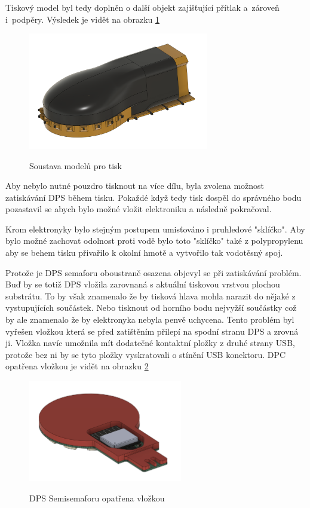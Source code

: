 Tiskový model byl tedy doplněn o další objekt zajišťující přítlak a~zároveň i~podpěry.
Výsledek je vidět na obrazku \ref{semisemafor-box-pritlak}

\begin{figure}[!h]
  \centering
  \includegraphics[width=0.7\textwidth]{text/PraktickaCast/img/SemiSemafor-BOX-pritlak.png}
  \label{semisemafor-box-pritlak}
  \caption{Soustava modelů pro tisk}
\end{figure}

Aby nebylo nutné pouzdro tisknout na více dílu, byla zvolena možnost zatiskávání DPS během tisku.
Pokaždé když tedy tisk dospěl do správného bodu pozastavil se abych bylo možné vložit elektroniku a následně pokračoval.

Krom elektronyky bylo stejným postupem umisťováno i pruhledové "sklíčko".
Aby bylo možné zachovat odolnost proti vodě bylo toto "sklíčko" také z polypropylenu aby se behem tisku přivařilo k okolní hmotě a vytvořilo tak vodotěsný spoj.

Protože je DPS semaforu oboustraně osazena objevyl se při zatiskávání problém.
Buď by se totiž DPS vložila zarovnaná s aktuální tiskovou vrstvou plochou substrátu.
To by však znamenalo že by tisková hlava mohla narazit do nějaké z vystupujících součástek.
Nebo tisknout od horního bodu nejvyžší součástky což by ale znamenalo že by elektronyka nebyla penvě uchycena.
Tento problém byl vyřešen vložkou která se před zatištěním přilepí na spodní stranu DPS a zrovná ji.
Vložka navíc umožnila mít dodatečné kontaktní pložky z druhé strany USB, protože bez ni by se tyto pložky vyskratovali o stínění USB konektoru.
DPC opatřena vložkou je vidět na obrazku \ref{semisemafor-vlozka}

\begin{figure}[!h]
  \centering
  \includegraphics[width=0.6\textwidth]{text/PraktickaCast/img/SemiSemafor-vlozka.png}
  \label{semisemafor-vlozka}
  \caption{DPS Semisemaforu opatřena vložkou}
\end{figure}

